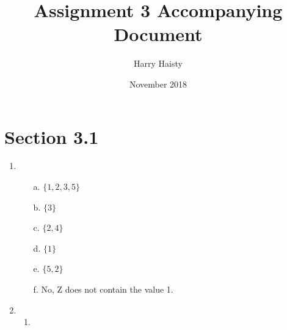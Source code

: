 \documentclass[11pt]{article}
\title{Assignment 3 Accompanying Document}
\author{Harry Haisty}
\date{November 2018}
\begin{document}
\maketitle

\section*{Section 3.1}

\begin{enumerate}
    \item \begin{enumerate}
    \item[a.] $\{1, 2, 3, 5\}$
    \item[b.] $\{3\}$
    \item[c.] $\{2,4\}$
    \item[d.] $\{1\}$
    \item[e.] $\{5, 2\}$
    \item[f.] No, Z does not contain the value 1.
\end{enumerate}

    \item \begin{enumerate}
        \item
    \end{enumerate}
\end{enumerate}
\end{document}
